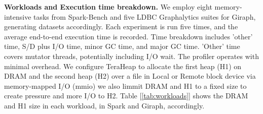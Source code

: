 \documentclass[nonacm,sigplan]{acmart}
\begin{document}
\textbf{Workloads and Execution time breakdown.} We employ eight memory-intensive tasks from Spark-Bench and five LDBC Graphalytics suites for Giraph, generating datasets accordingly. Each experiment is run five times, and the average end-to-end execution time is recorded. Time breakdown includes 'other' time, S/D plus I/O time, minor GC time, and major GC time. 'Other' time covers mutator threads, potentially including I/O wait. The profiler operates with minimal overhead. We configure TeraHeap to allocate the first heap (H1) on DRAM and the second heap (H2) over a file in Local or Remote block device via memory-mapped I/O (mmio) we also limmit DRAM and H1 to a fixed size to create pressure and more I/O to H2. Table [\ref{tab:workloads}] shows the DRAM and H1 size in each workload, in Spark and Giraph, accordingly.
\begin{table}[h]
\centering
{}
\caption{Teraheap workload configuration table.}
\label{tab:workloads}
\end{table}
\end{document}
